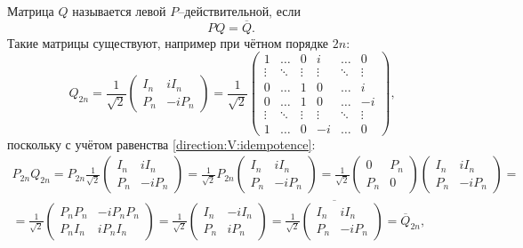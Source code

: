 Матрица $Q$ называется левой $P$--действительной, если
\[
    P Q = \overline{Q}.
\]
Такие матрицы существуют, например при чётном порядке $2n$:
\begin{equation}~\label{direction:Q:even}
    Q_{2n}
    = \frac{1}{\sqrt{2}}
    \begin{pmatrix}
        I_n & i I_n  \\
        P_n & -i P_n
    \end{pmatrix}
    =  \frac{1}{\sqrt{2}}
    \begin{pmatrix}
        1      & \dots  & 0      & i      & \dots  & 0      \\
        \vdots & \ddots & \vdots & \vdots & \ddots & \vdots \\
        0      & \dots  & 1      & 0      & \dots  & i      \\
        0      & \dots  & 1      & 0      & \dots  & -i     \\
        \vdots & \ddots & \vdots & \vdots & \ddots & \vdots \\
        1      & \dots  & 0      & -i     & \dots  & 0
    \end{pmatrix} ,
\end{equation}
поскольку с учётом равенства \eqref{direction:V:idempotence}:
\begin{multline*}
    P_{2n} Q_{2n}
    = P_{2n}
    \frac{1}{\sqrt{2}}
    \begin{pmatrix}
        I_n & i I_n  \\
        P_n & -i P_n
    \end{pmatrix}
    = \frac{1}{\sqrt{2}}
    P_{2n}
    \begin{pmatrix}
        I_n & i I_n  \\
        P_n & -i P_n
    \end{pmatrix}
    = \frac{1}{\sqrt{2}}
    \begin{pmatrix}
        0   & P_n \\
        P_n & 0
    \end{pmatrix}
    \begin{pmatrix}
        I_n & i I_n  \\
        P_n & -i P_n
    \end{pmatrix} = \\
    = \frac{1}{\sqrt{2}}
    \begin{pmatrix}
        P_n P_n & - i P_n P_n \\
        P_n I_n & i P_n I_n
    \end{pmatrix}
    = \frac{1}{\sqrt{2}}
    \begin{pmatrix}
        I_n & - i I_n \\
        P_n & i P_n
    \end{pmatrix}
    = \overline{
        \frac{1}{\sqrt{2}}
        \begin{pmatrix}
            I_n & i I_n  \\
            P_n & -i P_n
        \end{pmatrix}
    }
    = \overline{Q}_{2n} ,
\end{multline*}

